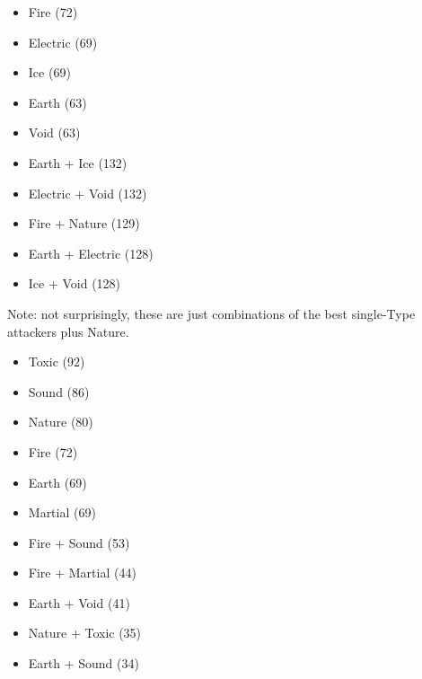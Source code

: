 
\begin{itemize}
	\item{Fire (72)}
	\item{Electric (69)}
	\item{Ice (69)}
	\item{Earth (63)}
	\item{Void (63)}
\end{itemize}


\begin{itemize}
	\item{Earth + Ice (132)}
	\item{Electric + Void (132)}
	\item{Fire + Nature (129)}
	\item{Earth + Electric (128)}
	\item{Ice + Void (128)}
\end{itemize}

\noindent Note: not surprisingly, these are just combinations of the best single-Type attackers plus Nature.


\begin{itemize}
	\item{Toxic (92)}
	\item{Sound (86)}
	\item{Nature (80)}
	\item{Fire (72)}
	\item{Earth (69)}
	\item{Martial (69)}
\end{itemize}

\begin{itemize}
	\item{Fire + Sound (53)}
	\item{Fire + Martial (44)}
	\item{Earth + Void (41)}
	\item{Nature + Toxic (35)}
	\item{Earth + Sound (34)}
\end{itemize}


